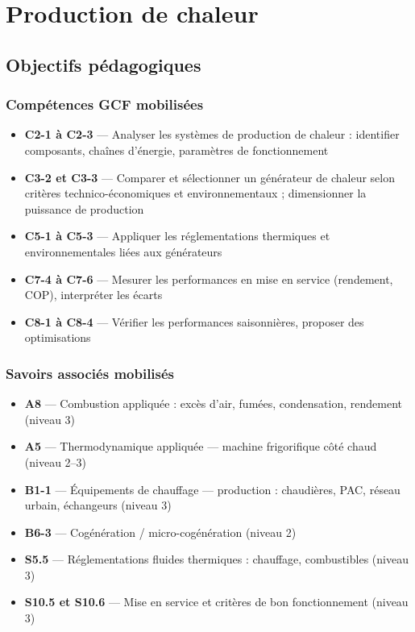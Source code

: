 \chapter{Production de chaleur}

\section{Objectifs pédagogiques}

\subsection*{Compétences GCF mobilisées}
\begin{itemize}
  \item \textbf{C2-1 à C2-3} — Analyser les systèmes de production de chaleur : identifier composants, chaînes d'énergie, paramètres de fonctionnement
  \item \textbf{C3-2 et C3-3} — Comparer et sélectionner un générateur de chaleur selon critères technico-économiques et environnementaux ; dimensionner la puissance de production
  \item \textbf{C5-1 à C5-3} — Appliquer les réglementations thermiques et environnementales liées aux générateurs
  \item \textbf{C7-4 à C7-6} — Mesurer les performances en mise en service (rendement, COP), interpréter les écarts
  \item \textbf{C8-1 à C8-4} — Vérifier les performances saisonnières, proposer des optimisations
\end{itemize}

\subsection*{Savoirs associés mobilisés}
\begin{itemize}
  \item \textbf{A8} — Combustion appliquée : excès d'air, fumées, condensation, rendement (niveau 3)
  \item \textbf{A5} — Thermodynamique appliquée — machine frigorifique côté chaud (niveau 2–3)
  \item \textbf{B1-1} — Équipements de chauffage — production : chaudières, PAC, réseau urbain, échangeurs (niveau 3)
  \item \textbf{B6-3} — Cogénération / micro-cogénération (niveau 2)
  \item \textbf{S5.5} — Réglementations fluides thermiques : chauffage, combustibles (niveau 3)
  \item \textbf{S10.5 et S10.6} — Mise en service et critères de bon fonctionnement (niveau 3)
\end{itemize}


